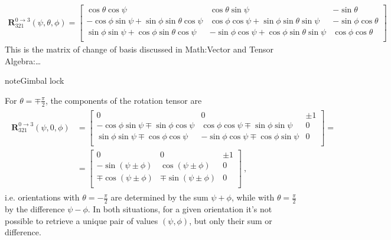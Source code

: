\documentclass[letterpaper,10pt,english]{jupyterBook}
\begin{document}
\begin{equation*}
\begin{split}\mathbf{R}^{0 \rightarrow 3}_{321}(\psi,\theta,\phi) = 
\begin{bmatrix}
  \cos \theta \cos \psi                                &   \cos \theta \sin \psi                               &  -\sin \theta          \\
 -\cos\phi \sin \psi + \sin \phi \sin \theta \cos \psi & \cos \phi \cos \psi + \sin \phi \sin \theta \sin \psi & -\sin \phi \cos \theta \\ 
  \sin\phi \sin \psi + \cos \phi \sin \theta \cos \psi &-\sin \phi \cos \psi + \cos \phi \sin \theta \sin \psi &  \cos \phi \cos \theta \\ 
\end{bmatrix}\end{split}
\end{equation*}
\sphinxAtStartPar
This is the matrix of change of basis discussed in Math:Vector and Tensor Algebra:…

\begin{sphinxadmonition}{note}{Gimbal lock}

\sphinxAtStartPar
For \(\theta = \mp \frac{\pi}{2}\), the components of the rotation tensor are
\begin{equation*}
\begin{split}\begin{aligned}
 \mathbf{R}^{0 \rightarrow 3}_{321}(\psi, 0, \phi) 
 & = 
 \begin{bmatrix}
             0 &         0 & \pm 1 \\
    -\cos \phi \sin \psi \mp \sin \phi \cos \psi &  \cos \phi \cos \psi \mp \sin \phi \sin \psi & 0 \\
     \sin \phi \sin \psi \mp \cos \phi \cos \psi & -\sin \phi \cos \psi \mp \cos \phi \sin \psi & 0 \\
 \end{bmatrix} = \\
 & = 
 \begin{bmatrix}
             0 &         0 & \pm 1 \\
      - \sin(\psi \pm \phi) &     \cos(\psi \pm \phi) & 0 \\
    \mp \cos(\psi \pm \phi) & \mp \sin(\psi \pm \phi) & 0 \\
 \end{bmatrix} \ ,
\end{aligned}\end{split}
\end{equation*}
\sphinxAtStartPar
i.e. orientations with \(\theta = - \frac{\pi}{2}\) are determined by the sum \(\psi + \phi\), while with \(\theta = \frac{\pi}{2}\) by the difference \(\psi - \phi\). In both situations, for a given orientation it’s not possible to retrieve a unique pair of values \((\psi, \phi)\), but only their sum or difference.
\end{sphinxadmonition}
\end{document}
